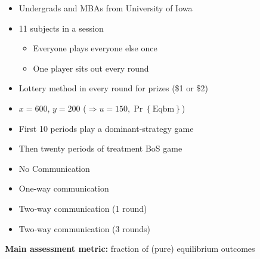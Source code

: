 \documentclass{beamer}
\begin{document}
\begin{frame}
	\begin{card}
		\begin{itemize}
			\item Undergrads and MBAs from University of Iowa
			\item 11 subjects in a session
			\begin{itemize}
				\item Everyone plays everyone else once
				\item One player sits out every round
			\end{itemize}
			\item Lottery method in every round for prizes (\$1 or \$2)
			\item $x=600$, $y=200$ ($\Longrightarrow u=150, \Pr\left\{\text{Eqbm}\right\}$) 
			\item First 10 periods play a dominant-strategy game
			\item Then twenty periods of treatment BoS game
		\end{itemize}
	\end{card}
\end{frame}

\begin{frame}
	\begin{card}
		\begin{itemize}
			\item No Communication
			\item One-way communication
			\item Two-way communication (1 round)
			\item Two-way communication (3 rounds)
		\end{itemize}
		\end{card}
\begin{card}		
\textbf{Main assessment metric:} fraction of (pure) equilibrium outcomes
	\end{card}
\end{frame}
\end{document}
